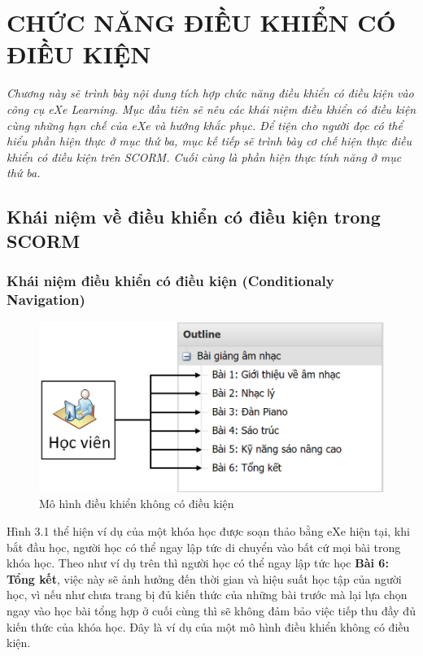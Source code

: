 \chapter{CHỨC NĂNG ĐIỀU KHIỂN CÓ ĐIỀU KIỆN}
\begin{flushleft}
	\fontsize{12pt}{7pt}\selectfont
	\textit{Chương này sẽ trình bày nội dung tích hợp chức năng điều khiển có điều kiện vào công cụ eXe Learning. Mục đầu tiên sẽ nêu các khái niệm điều khiển có điều kiện cùng những hạn chế của eXe và hướng khắc phục. Để tiện cho người đọc có thể hiểu phần hiện thực ở mục thứ ba, mục kế tiếp sẽ trình bày cơ chế hiện thực điều khiển có điều kiện trên SCORM. Cuối cùng là phần hiện thực tính năng ở mục thứ ba.}
\end{flushleft}

\section{Khái niệm về điều khiển có điều kiện trong SCORM}
\subsection{Khái niệm điều khiển có điều kiện (Conditionaly Navigation)}
		

	\begin{center}
	\begin{figure}[htp]
		\begin{center}
			\includegraphics[width=13cm]{Chapter3/Pictures/picture31.png}
		\end{center}
		\caption{Mô hình điều khiển không có điều kiện}
		\label{refpicture12}
	\end{figure}
\end{center}



Hình 3.1 thể hiện ví dụ của một khóa học được soạn thảo bằng eXe hiện tại, khi bắt đầu học, người học có thể ngay lập tức di chuyển vào bất cứ mọi bài trong khóa học. Theo như ví dụ trên thì người học có thể ngay lập tức học \textbf{Bài 6: Tổng kết}, việc này sẽ ảnh hưởng đến thời gian và hiệu suất học tập của người học, vì nếu như chưa trang bị đủ kiến thức của những bài trước mà lại lựa chọn ngay vào học bài tổng hợp ở cuối cùng thì sẽ không đảm bảo việc tiếp thu đầy đủ kiến thức của khóa học. Đây là ví dụ của một mô hình điều khiển không có điều kiện.\\


